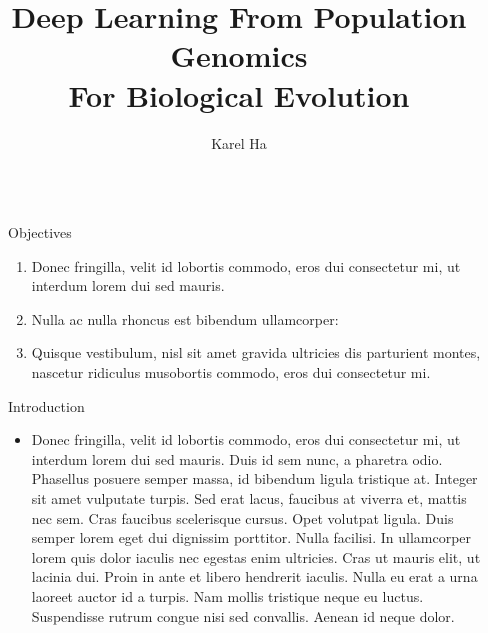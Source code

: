 \documentclass[final,hyperref={pdfpagelabels=false}]{beamer}
\title{\huge Deep Learning
From Population Genomics \\
For Biological Evolution} %
\author{Karel Ha} %
\institute{
Life Sciences -- Faculty of Natural Sciences\\
Imperial College London} %
\begin{document}

\begin{frame}[t] %

\begin{columns}[t] %

\begin{column}{.02\textwidth}\end{column} %

\begin{column}{.465\textwidth} %


\begin{block}{Objectives}

\begin{enumerate}
\item Donec fringilla, velit id lobortis commodo, eros dui consectetur mi, ut interdum lorem dui sed mauris.
\item Nulla ac nulla rhoncus est bibendum ullamcorper:
\item Quisque vestibulum, nisl sit amet gravida ultricies dis parturient montes, nascetur ridiculus musobortis commodo, eros dui consectetur mi.
\end{enumerate}

\end{block}

            
\begin{block}{Introduction}

\begin{itemize}
\item Donec fringilla, velit id lobortis commodo, eros dui consectetur mi, ut interdum lorem dui sed mauris. Duis id sem nunc, a pharetra odio. Phasellus posuere \alert{semper massa}, id bibendum ligula tristique at. Integer sit amet vulputate turpis. Sed erat lacus, faucibus at viverra et, mattis nec sem. Cras faucibus \alert{scelerisque} cursus. Opet volutpat ligula. Duis semper lorem eget dui dignissim porttitor. Nulla facilisi. In ullamcorper lorem quis dolor iaculis nec egestas enim ultricies. Cras ut mauris elit, ut lacinia dui. Proin in ante et libero hendrerit iaculis. Nulla eu erat a urna laoreet auctor id a turpis. Nam mollis tristique neque eu luctus. Suspendisse rutrum congue nisi sed convallis. Aenean id neque dolor.
\end{itemize}


\end{block}
\end{column}
\end{columns}
\end{frame}
\end{document}
